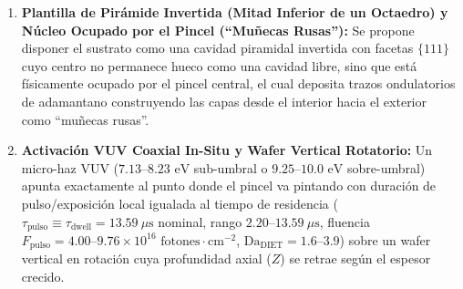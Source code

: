 \documentclass[10pt,twocolumn,a4paper]{article}
\begin{document}
\begin{enumerate}
    \item \textbf{Plantilla de Pirámide Invertida (Mitad Inferior de un Octaedro) y Núcleo Ocupado por el Pincel (``Muñecas Rusas''):} Se propone disponer el sustrato como una cavidad piramidal invertida con facetas $\{111\}$ cuyo centro no permanece hueco como una cavidad libre, sino que está físicamente ocupado por el pincel central, el cual deposita trazos ondulatorios de adamantano construyendo las capas desde el interior hacia el exterior como ``muñecas rusas''.
    \item \textbf{Activación VUV Coaxial In-Situ y Wafer Vertical Rotatorio:} Un micro-haz VUV ($7.13\text{--}8.23\text{ eV}$ sub-umbral o $9.25\text{--}10.0\text{ eV}$ sobre-umbral) apunta exactamente al punto donde el pincel va pintando con duración de pulso/exposición local igualada al tiempo de residencia ($\tau_{\text{pulso}} \equiv \tau_{\text{dwell}} = 13.59\ \mu\text{s}$ nominal, rango $2.20\text{--}13.59\ \mu\text{s}$, fluencia $F_{\text{pulso}} = 4.00\text{--}9.76 \times 10^{16}\text{ fotones}\cdot\text{cm}^{-2}$, $\text{Da}_{\text{DIET}} = 1.6\text{--}3.9$) sobre un wafer vertical en rotación cuya profundidad axial ($Z$) se retrae según el espesor crecido.

\end{enumerate}
\end{document}
